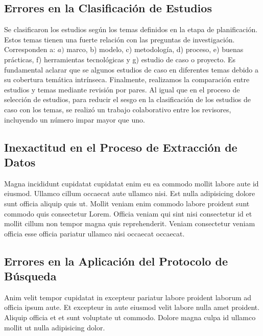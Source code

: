 \subsection{Errores en la Clasificación de Estudios}
Se clasificaron los estudios según los temas definidos en la etapa de planificación. Estos temas tienen una fuerte relación con las preguntas de investigación. Corresponden a: $a)$ marco, b) modelo, c) metodología, d) proceso, e) buenas prácticas, f) herramientas tecnológicas y g) estudio de caso o proyecto. Es fundamental aclarar que se  algunos estudios de caso en diferentes temas debido a su cobertura temática intrínseca. Finalmente, realizamos la comparación entre estudios y temas mediante revisión por pares. Al igual que en el proceso de selección de estudios, para reducir el sesgo en la clasificación de los estudios de caso con los temas, se realizó un trabajo colaborativo entre los revisores, incluyendo un número impar mayor que uno.
    
\subsection{Inexactitud en el Proceso de Extracción de Datos}
Magna incididunt cupidatat cupidatat enim eu ea commodo mollit labore aute id eiusmod. Ullamco cillum occaecat aute ullamco nisi. Est nulla adipisicing dolore sunt officia aliquip quis ut. Mollit veniam enim commodo labore proident sunt commodo quis consectetur Lorem. Officia veniam qui sint nisi consectetur id et mollit cillum non tempor magna quis reprehenderit. Veniam consectetur veniam officia esse officia pariatur ullamco nisi occaecat occaecat.

\subsection{Errores en la Aplicación del Protocolo de Búsqueda}
Anim velit tempor cupidatat in excepteur pariatur labore proident laborum ad officia ipsum aute. Et excepteur in aute eiusmod velit labore nulla amet proident. Aliquip officia et et sunt voluptate ut commodo. Dolore magna culpa id ullamco mollit ut nulla adipisicing dolor.

